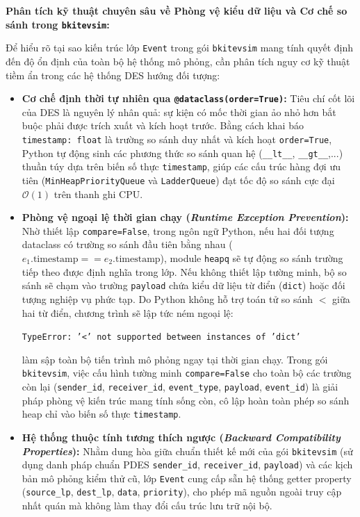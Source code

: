 \newpage
\textbf{Phân tích kỹ thuật chuyên sâu về Phòng vệ kiểu dữ liệu và Cơ chế so sánh trong \texttt{bkitevsim}:}

Để hiểu rõ tại sao kiến trúc lớp \texttt{Event} trong gói \texttt{bkitevsim} mang tính quyết định đến độ ổn định của toàn bộ hệ thống mô phỏng, cần phân tích nguy cơ kỹ thuật tiềm ẩn trong các hệ thống DES hướng đối tượng:
\begin{itemize}[leftmargin=1.5em, itemsep=3pt]
\item \textbf{Cơ chế định thời tự nhiên qua \texttt{@dataclass(order=True)}:} Tiêu chí cốt lõi của DES là nguyên lý nhân quả: sự kiện có mốc thời gian ảo nhỏ hơn bắt buộc phải được trích xuất và kích hoạt trước. Bằng cách khai báo \texttt{timestamp: float} là trường so sánh duy nhất và kích hoạt \texttt{order=True}, Python tự động sinh các phương thức so sánh quan hệ (\texttt{\_\_lt\_\_}, \texttt{\_\_gt\_\_},...) thuần túy dựa trên biến số thực \texttt{timestamp}, giúp các cấu trúc hàng đợi ưu tiên (\texttt{MinHeapPriorityQueue} và \texttt{LadderQueue}) đạt tốc độ so sánh cực đại $\mathcal{O}(1)$ trên thanh ghi CPU.
\item \textbf{Phòng vệ ngoại lệ thời gian chạy (\textit{Runtime Exception Prevention}):} Nhờ thiết lập \texttt{compare=False}, trong ngôn ngữ Python, nếu hai đối tượng dataclass có trường so sánh đầu tiên bằng nhau ($e_1.\text{timestamp} == e_2.\text{timestamp}$), module \texttt{heapq} sẽ tự động so sánh trường tiếp theo được định nghĩa trong lớp. Nếu không thiết lập tường minh, bộ so sánh sẽ chạm vào trường \texttt{payload} chứa kiểu dữ liệu từ điển (\texttt{dict}) hoặc đối tượng nghiệp vụ phức tạp. Do Python không hỗ trợ toán tử so sánh $<$ giữa hai từ điển, chương trình sẽ lập tức ném ngoại lệ:
\begin{center}
\texttt{TypeError: '<' not supported between instances of 'dict'}
\end{center}
làm sập toàn bộ tiến trình mô phỏng ngay tại thời gian chạy. Trong gói \texttt{bkitevsim}, việc cấu hình tường minh \texttt{compare=False} cho toàn bộ các trường còn lại (\texttt{sender\_id}, \texttt{receiver\_id}, \texttt{event\_type}, \texttt{payload}, \texttt{event\_id}) là giải pháp phòng vệ kiến trúc mang tính sống còn, cô lập hoàn toàn phép so sánh heap chỉ vào biến số thực \texttt{timestamp}.
\item \textbf{Hệ thống thuộc tính tương thích ngược (\textit{Backward Compatibility Properties}):} Nhằm dung hòa giữa chuẩn thiết kế mới của gói \texttt{bkitevsim} (sử dụng danh pháp chuẩn PDES \texttt{sender\_id}, \texttt{receiver\_id}, \texttt{payload}) và các kịch bản mô phỏng kiểm thử cũ, lớp \texttt{Event} cung cấp sẵn hệ thống getter property (\texttt{source\_lp}, \texttt{dest\_lp}, \texttt{data}, \texttt{priority}), cho phép mã nguồn ngoài truy cập nhất quán mà không làm thay đổi cấu trúc lưu trữ nội bộ.
\end{itemize}

